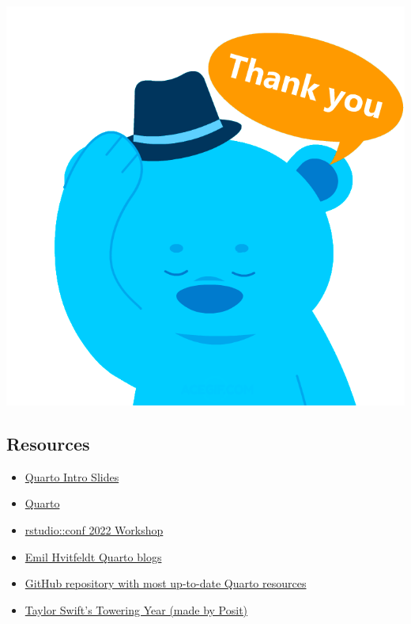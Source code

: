 \documentclass[
  letterpaper,
  DIV=11,
  numbers=noendperiod]{scrartcl}
\providecommand{\tightlist}{%
  \setlength{\itemsep}{0pt}\setlength{\parskip}{0pt}}\usepackage{longtable,booktabs,array}
\begin{document}
\includegraphics{TIOT_Intro_Quarto_files/mediabag/mdvdthkyou.gif}

\hypertarget{resources}{%
\subsection{Resources}\label{resources}}

\begin{itemize}
\tightlist
\item
  \href{https://quarto.org/docs/presentations/revealjs/demo/\#/title-slide}{Quarto
  Intro Slides}
\item
  \href{https://quarto.org/}{Quarto}
\item
  \href{https://rstudio-conf-2022.github.io/rmd-to-quarto/}{rstudio::conf
  2022 Workshop}
\item
  \href{https://emilhvitfeldt.com/blog\#category=quarto}{Emil Hvitfeldt
  Quarto blogs}
\item
  \href{https://github.com/mcanouil/awesome-quarto}{GitHub repository
  with most up-to-date Quarto resources}
\item
  \href{https://colorado.posit.co/rsc/tay-swift-tour/?mkt_tok=NzA5LU5YTi03MDYAAAGPv_qGZn8x95Dws5UJ3158TAN5EVLU68SYoumhNnRUtS8Jqw0Rnfx2k9OEXiNcWsQ1EiSEWvNctU3jPiOITrnXrkzgnRM0aSz1d3_5SP2e_W4}{Taylor
  Swift's Towering Year (made by Posit)}
\end{itemize}
\end{document}
